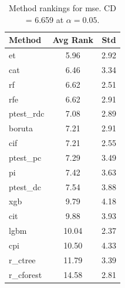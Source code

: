\begin{table}[h]
\centering
\caption{Method rankings for mse. CD = 6.659 at $\alpha=0.05$.}
\label{tab:ranks_mse}
\begin{tabular}{lcc}
\toprule
Method & Avg Rank & Std \\
\midrule
et & 5.96 & 2.92 \\
cat & 6.46 & 3.34 \\
rf & 6.62 & 2.51 \\
rfe & 6.62 & 2.91 \\
ptest_rdc & 7.08 & 2.89 \\
boruta & 7.21 & 2.91 \\
cif & 7.21 & 2.55 \\
ptest_pc & 7.29 & 3.49 \\
pi & 7.42 & 3.63 \\
ptest_dc & 7.54 & 3.88 \\
xgb & 9.79 & 4.18 \\
cit & 9.88 & 3.93 \\
lgbm & 10.04 & 2.37 \\
cpi & 10.50 & 4.33 \\
r_ctree & 11.79 & 3.39 \\
r_cforest & 14.58 & 2.81 \\
\bottomrule
\end{tabular}
\end{table}
